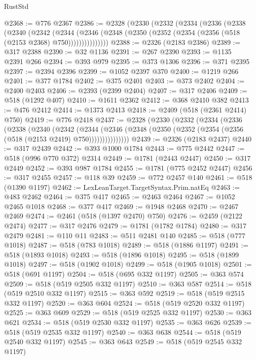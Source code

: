 \begin{lexlean}{RustStd}
\begin{coremodule}
@2368 := @776 @2367
@2386 := @2328
    (@2330
      (@2332
        (@2334
          (@2336
            (@2338
              (@2340
                (@2342
                  (@2344
                    (@2346
                      (@2348 (@2350 (@2352 (@2354 (@2356 (@518 (@2153 @2368) @750)))))))))))))))
@2388 := @2326 (@2183 @2386)
@2389 := @317 @2388
@2390 := @32 @1136
@2391 := @267 @2390
@2393 := @1135 @2391 @266
@2394 := @393 @979
@2395 := @373 @1306
@2396 := @371 @2395
@2397 := @2394 @2396
@2399 := @1052 @2397 @370
@2400 := @1219 @266
@2401 := @377 @1784
@2402 := @375 @2401
@2403 := @373 @2402
@2404 := @2400 @2403
@2406 := @2393 (@2399 @2404)
@2407 := @317 @2406
@2409 := @518 (@1292 @407)
@2410 := @1611 @2362
@2412 := @368 @2410 @382
@2413 := @476 @2412
@2414 := @1373 @2413
@2418 := @2409 (@518 (@2361 @2414) @750)
@2419 := @776 @2418
@2437 := @2328
    (@2330
      (@2332
        (@2334
          (@2336
            (@2338
              (@2340
                (@2342
                  (@2344
                    (@2346
                      (@2348 (@2350 (@2352 (@2354 (@2356 (@518 (@2153 @2419) @750)))))))))))))))
@2439 := @2326 (@2183 @2437)
@2440 := @317 @2439
@2442 := @393 @1000 @1784
@2443 := @775 @2442
@2447 := @518 (@996 @770 @372) @2314
@2449 := @1781 (@2443 @2447)
@2450 := @317 @2449
@2452 := @393 @987 @1784
@2455 := @1781 (@775 @2452 @2447)
@2456 := @317 @2455
@2457 := @118 @39
@2459 := @772 @2457 @140
@2461 := @518 (@1390 @1197)
@2462 := LexLeanTarget.TargetSyntax.Prim.natEq
@2463 := @483 @2462
@2464 := @375 @417
@2465 := @2463 @2464
@2467 := @1052 @2465 @1018
@2468 := @377 @417
@2469 := @1948 @2468
@2470 := @2467 @2469
@2474 := @2461 (@518 (@1397 @2470) @750)
@2476 := @2459 (@2122 @2474)
@2477 := @317 @2476
@2479 := @1781 (@1782 @1784)
@2480 := @317 @2479
@2481 := @110 @11
@2483 := @511 @2481 @140
@2485 := @518 (@777 @1018)
@2487 := @518 (@783 @1018)
@2489 := @518 (@1886 @1197)
@2491 := @518 (@1893 @1018)
@2493 := @518 (@1896 @1018)
@2495 := @518 (@1899 @1018)
@2497 := @518 (@1902 @1018)
@2499 := @518 (@1905 @1018)
@2501 := @518 (@691 @1197)
@2504 := @518 (@695 @332 @1197)
@2505 := @363 @574
@2509 := @518 (@519 @2505 @332 @1197)
@2510 := @363 @587
@2514 := @518 (@519 @2510 @332 @1197)
@2515 := @363 @592
@2519 := @518 (@519 @2515 @332 @1197)
@2520 := @363 @604
@2524 := @518 (@519 @2520 @332 @1197)
@2525 := @363 @609
@2529 := @518 (@519 @2525 @332 @1197)
@2530 := @363 @621
@2534 := @518 (@519 @2530 @332 @1197)
@2535 := @363 @626
@2539 := @518 (@519 @2535 @332 @1197)
@2540 := @363 @638
@2544 := @518 (@519 @2540 @332 @1197)
@2545 := @363 @643
@2549 := @518 (@519 @2545 @332 @1197)

\end{coremodule}
\end{lexlean}
